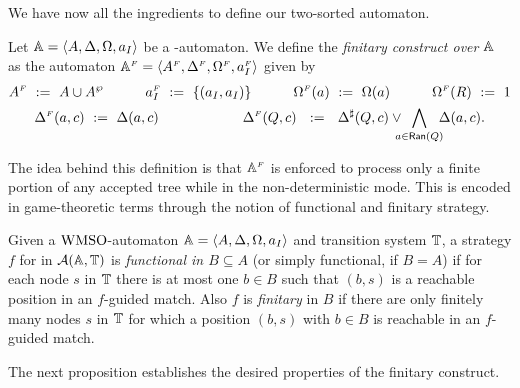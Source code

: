 We have now all the ingredients to define our two-sorted automaton.

\begin{definition}\label{def:finitaryconstruct}
Let $\mathbb{A} = \langle{A,\Delta,\Omega,a_I}\rangle$ be a {\wmso-automaton}. We define the \emph{finitary construct over $\mathbb{A}$} as the automaton $\mathbb{A}^{{\scriptscriptstyle F}} = \langle{A^{{\scriptscriptstyle F}},\Delta^{{\scriptscriptstyle F}},\Omega^{{\scriptscriptstyle F}},a_I^{{\scriptscriptstyle F}}}\rangle$ given by
\begin{gather*}
        A^{{\scriptscriptstyle F}} \ \mathrel{: =} \  A \cup A^{\wp} \quad\quad\quad a_I^{{\scriptscriptstyle F}} \ \mathrel{: =} \  \{(a_I,a_I)\} \quad\quad\quad \Omega^{{\scriptscriptstyle F}}(a) \ \mathrel{: =} \  \Omega(a) \quad\quad\quad \Omega^{{\scriptscriptstyle F}}(R) \ \mathrel{: =} \  1 \\
        \Delta^{{\scriptscriptstyle F}}(a,c) \ \mathrel{: =} \  \Delta(a,c) \qquad \qquad \qquad 
        \Delta^{{\scriptscriptstyle F}}(Q,c) \ \ \mathrel{: =} \ \  \Delta^{\sharp}(Q,c) \vee \! \! \! \! \bigwedge_{a \in \mathsf{Ran}(Q)} \! \! \! \Delta(a,c).
      \end{gather*}
\end{definition}

The idea behind this definition is that $\mathbb{A}^{{\scriptscriptstyle F}}$ is enforced to process only a finite portion of any accepted tree while in the non-deterministic mode. This is encoded in game-theoretic terms through the notion of functional and finitary strategy. 

\begin{definition}\label{def:StratfunctionalFinitary}
Given a $\mathrm{WMSO}$-automaton $\mathbb{A} = \langle{A,\Delta,\Omega,a_I}\rangle$ and transition system $\mathbb{T}$, a strategy $f$ for \eloise in $\mathcal{A}(\mathbb{A},\mathbb{T})$ is \emph{functional in $B \subseteq A$} (or simply functional, if $B=A$) if for each node $s$ in $\mathbb{T}$ there is at most one $b \in B$ such that $(b,s)$ is a reachable position in an $f$-guided match. Also $f$ is \emph{finitary} in $B$ if there are only finitely many nodes $s$ in $\mathbb{T}$ for which a position $(b,s)$ with $b \in B$ is reachable in an $f$-guided match.
\end{definition}



The next proposition establishes the desired properties of the finitary
construct.


